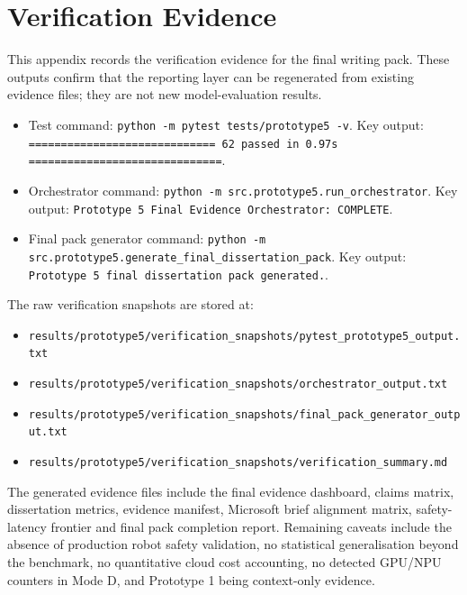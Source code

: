 \section{Verification Evidence}
\label{sec:appendix_verification_evidence}

This appendix records the verification evidence for the final writing pack. These outputs confirm that the reporting layer can be regenerated from existing evidence files; they are not new model-evaluation results.

\begin{itemize}
    \item Test command: \texttt{python -m pytest tests/prototype5 -v}. Key output: \texttt{============================= 62 passed in 0.97s ==============================}.
    \item Orchestrator command: \texttt{python -m src.prototype5.run_orchestrator}. Key output: \texttt{Prototype 5 Final Evidence Orchestrator: COMPLETE}.
    \item Final pack generator command: \texttt{python -m src.prototype5.generate_final_dissertation_pack}. Key output: \texttt{Prototype 5 final dissertation pack generated.}.
\end{itemize}

The raw verification snapshots are stored at:
\begin{itemize}
    \item \texttt{results/prototype5/verification\_snapshots/pytest\_prototype5\_output.txt}
    \item \texttt{results/prototype5/verification\_snapshots/orchestrator\_output.txt}
    \item \texttt{results/prototype5/verification\_snapshots/final\_pack\_generator\_output.txt}
    \item \texttt{results/prototype5/verification\_snapshots/verification\_summary.md}
\end{itemize}

The generated evidence files include the final evidence dashboard, claims matrix, dissertation metrics, evidence manifest, Microsoft brief alignment matrix, safety-latency frontier and final pack completion report. Remaining caveats include the absence of production robot safety validation, no statistical generalisation beyond the benchmark, no quantitative cloud cost accounting, no detected GPU/NPU counters in Mode D, and Prototype 1 being context-only evidence.
